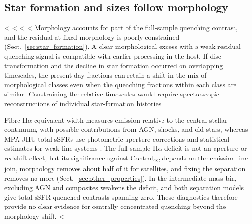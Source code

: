 \documentclass{aa}
\newcommand{\CC}{Control\textsubscript{4C}}
\newcommand{\CG}{CG\textsubscript{4}}
\begin{document}
\subsection{Star formation and sizes follow morphology}\label{sec:weaker_signals}

<%
<%
<%
<%
Morphology accounts for part of the full-sample quenching contrast, and the residual at fixed morphology is poorly constrained (Sect.~\ref{sec:star_formation}). A clear morphological excess with a weak residual quenching signal is compatible with earlier processing in the host. If disc transformation and the decline in star formation occurred on overlapping timescales, the present-day fractions can retain a shift in the mix of morphological classes even when the quenching fractions within each class are similar. Constraining the relative timescales would require spectroscopic reconstructions of individual star-formation histories.

Fibre H\(\alpha\) equivalent width measures emission relative to the central stellar continuum, with possible contributions from AGN, shocks, and old stars, whereas MPA-JHU total sSFRs use photometric aperture corrections and statistical estimates for weak-line systems \citep{Brinchmann+04,Salim+07}. The full-sample H\(\alpha\) deficit is not an aperture or redshift effect, but its significance against \CC{} depends on the emission-line join, morphology removes about half of it for satellites, and fixing the separation removes no more (Sect.~\ref{sec:other_properties}). In the intermediate-mass bin, excluding AGN and composites weakens the deficit, and both separation models give total-sSFR quenched contrasts spanning zero. These diagnostics therefore provide no clear evidence for centrally concentrated quenching beyond the morphology shift. <%
\end{document}
